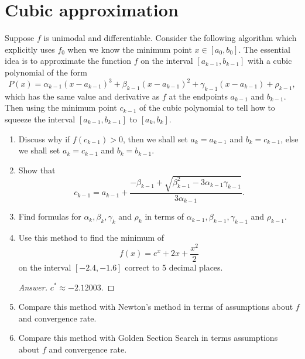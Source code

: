 \section{Cubic approximation}
Suppose \(f\) is unimodal and differentiable.
Consider the following algorithm which explicitly uses \(f_0\) when we know the minimum point \(x\in[a_0, b_0]\).
The essential idea is to approximate the function \(f\) on the interval \([a_{k-1}, b_{k-1}]\) with a cubic polynomial of the form
\[ P(x)=\alpha_{k-1}(x-a_{k-1})^3+\beta_{k-1}(x-a_{k-1})^2 + \gamma_{k-1}(x-a_{k-1})+\rho_{k-1}, \]
which has the same value and derivative as \(f\) at the endpoints \(a_{k-1}\) and \(b_{k-1}\).
Then using the minimum point \(c_{k-1}\) of the cubic polynomial to tell how to squeeze the interval \([a_{k-1}, b_{k-1}]\) to \([a_k, b_k]\).
\begin{enumerate}
	\item Discuss why if \(f(c_{k-1})>0\), then we shall set \(a_k=a_{k-1}\) and \(b_k=c_{k-1}\), else we shall set \(a_k=c_{k-1}\) and \(b_k=b_{k-1}\).
	\item Show that
	\[ c_{k-1}=a_{k-1}+\frac{-\beta_{k-1}+\sqrt{\beta_{k-1}^2-3\alpha_{k-1}\gamma_{k-1}}}{3\alpha_{k-1}}. \]
	\item Find formulas for \(\alpha_{k}, \beta_{k}, \gamma_{k}\) and \(\rho_k\) in terms of  \(\alpha_{k-1}, \beta_{k-1}, \gamma_{k-1}\) and \(\rho_{k-1}\).
	\item Use this method to find the minimum of
	\[ f(x)=e^x+2x+\frac{x^2}{2} \]
	on the interval \([-2.4, -1.6]\) correct to 5 decimal places.
	\begin{proof}[Answer]
	\(c^*\approx-2.12003\).
	\end{proof}
	\item Compare this method with Newton's method in terms of assumptions about \(f\) and convergence rate.
	\item Compare this method with Golden Section Search in terms assumptions about \(f\) and convergence rate.
\end{enumerate}



